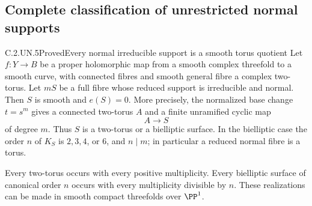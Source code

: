 \subsection{Complete classification of unrestricted normal supports}

\begin{statement}{C.2.UN.5}{Proved}{Every normal irreducible support is a smooth torus quotient}
Let $f:Y\to B$ be a proper holomorphic map from a smooth
complex threefold to a smooth curve, with connected fibres
and smooth general fibre a complex two-torus. Let $mS$ be
a full fibre whose reduced support is irreducible and normal.
Then $S$ is smooth and $e(S)=0$. More precisely, the
normalized base change $t=s^m$ gives a connected two-torus
$A$ and a finite unramified cyclic map
\[
                         A\longrightarrow S
\]
of degree $m$. Thus $S$ is a two-torus or a bielliptic
surface. In the bielliptic case the order $n$ of $K_S$ is
$2,3,4$, or $6$, and $n\mid m$; in particular a reduced
normal fibre is a torus.

Every two-torus occurs with every positive multiplicity.
Every bielliptic surface of canonical order $n$ occurs
with every multiplicity divisible by $n$. These
realizations can be made in smooth compact threefolds
over $\PP^1$.
\end{statement}
